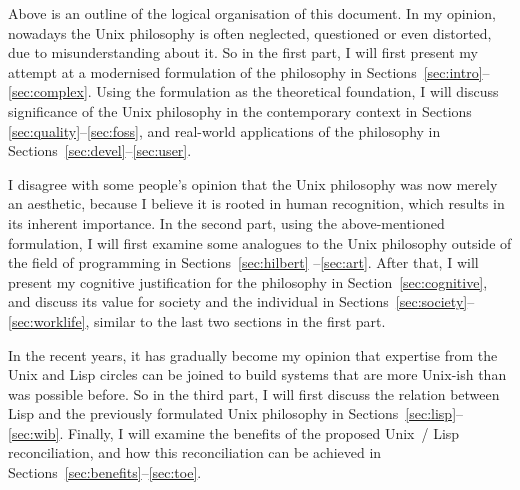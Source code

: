 \documentclass{article}
\begin{document}
\begin{wquoting}
\end{wquoting}

Above is an outline of the logical organisation of this document.  In my
opinion, nowadays the Unix philosophy is often neglected, questioned or
even distorted, due to misunderstanding about it.  So in the first part,
I will first present my attempt at a modernised formulation of the
philosophy in Sections~\ref{sec:intro}--\ref{sec:complex}.  Using the
formulation as the theoretical foundation, I will discuss significance
of the Unix philosophy in the contemporary context in Sections~%
\ref{sec:quality}--\ref{sec:foss}, and real-world applications
of the philosophy in Sections~\ref{sec:devel}--\ref{sec:user}.

I disagree with some people's opinion that the Unix philosophy was now
merely an aesthetic, because I believe it is rooted in human recognition,
which results in its inherent importance.  In the second part, using the
above-mentioned formulation, I will first examine some analogues to the Unix
philosophy outside of the field of programming in Sections~\ref{sec:hilbert}%
--\ref{sec:art}.  After that, I will present my cognitive justification
for the philosophy in Section~\ref{sec:cognitive}, and discuss its
value for society and the individual in Sections~\ref{sec:society}--%
\ref{sec:worklife}, similar to the last two sections in the first part.

In the recent years, it has gradually become my opinion that expertise from
the Unix and Lisp circles can be joined to build systems that are more
Unix-ish than was possible before.  So in the third part, I will first
discuss the relation between Lisp and the previously formulated Unix
philosophy in Sections~\ref{sec:lisp}--\ref{sec:wib}.  Finally, I will
examine the benefits of the proposed Unix~/ Lisp reconciliation, and how this
reconciliation can be achieved in Sections~\ref{sec:benefits}--\ref{sec:toe}.
\end{document}
